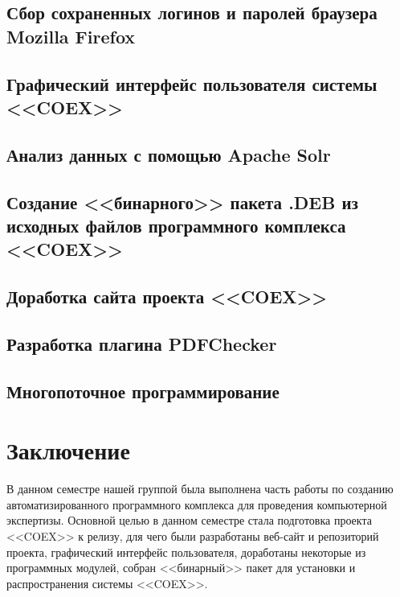 \subsection{Сбор сохраненных логинов и паролей браузера Mozilla Firefox}



\newpage
\subsection{Графический интерфейс пользователя системы <<COEX>>}

\newpage
\subsection{Анализ данных с помощью Apache Solr}

 
\newpage
\subsection {Создание <<бинарного>> пакета .DEB из исходных файлов программного комплекса <<COEX>>} 


\newpage 
\subsection{Доработка сайта проекта <<COEX>>}

\newpage
\subsection{Разработка плагина PDFChecker}


\newpage


\newpage
\subsection{Многопоточное программирование} 



\newpage
\section*{Заключение}
В данном семестре нашей группой была выполнена часть работы по созданию автоматизированного программного комплекса для проведения компьютерной экспертизы. Основной целью в данном семестре стала подготовка проекта <<COEX>> к релизу, для чего были разработаны веб-сайт и репозиторий проекта, графический интерфейс пользователя, доработаны некоторые из программных модулей, собран <<бинарный>> пакет для установки и распространения системы <<COEX>>. 


